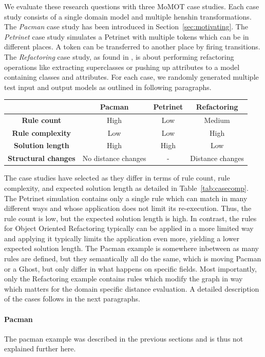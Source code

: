 We evaluate these research questions with three MoMOT case studies. Each case study consists of a single domain model and multiple henshin transformations.
The \textit{Pacman} case study has been introduced in Section~\ref{sec:motivating}. The \textit{Petrinet} case study simulates a Petrinet with multiple tokens which can be in different places. A token can be transferred to another place by firing transitions. The \textit{Refactoring} case study, as found in \cite{?}, is about performing refactoring operations like extracting superclasses or pushing up attributes to a model containing classes and attributes.
For each case, we randomly generated multiple test input and output models as outlined in following paragraphs.

\begin{table}
\begin{tabular}{|c|c|c|c|}
\hline 
 & \textbf{Pacman} & \textbf{Petrinet} & \textbf{Refactoring} \\
\hline
\textbf{Rule count} & High & Low & Medium \\
\hline
\textbf{Rule complexity} & Low & Low & High \\
\hline
\textbf{Solution length} & High & High & Low \\
\hline
\textbf{Structural changes} & No distance changes & - & Distance changes \\
\hline
\end{tabular}
\end{table}

The case studies have selected as they differ in terms of rule count, rule complexity, and expected solution length as detailed in Table~\ref{tab:casecomp}.
The Petrinet simulation contains only a single rule which can match in many different ways and whose application does not limit its re-execution. Thus, the rule count is low, but the expected solution length is high. In contrast, the rules for Object Oriented Refactoring typically can be applied in a more limited way and applying it typically limits the application even more, yielding a lower expected solution length. The Pacman example is somewhere inbetween as many rules are defined, but they semantically all do the same, which is moving Pacman or a Ghost, but only differ in what happens on specific fields. 
Most importantly, only the Refactoring example contains rules which modify the graph in way which matters for the domain specific distance evaluation. A detailed description of the cases follows in the next paragraphs.


\paragraph{Pacman} The pacman example was described in the previous sections and is thus not explained further here.


